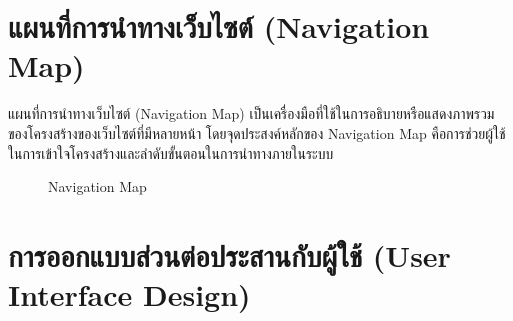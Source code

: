 
\section{แผนที่การนำทางเว็บไซต์ (Navigation Map)}
แผนที่การนำทางเว็บไซต์ (Navigation Map) เป็นเครื่องมือที่ใช้ในการอธิบายหรือแสดงภาพรวมของโครงสร้างของเว็บไซต์ที่มีหลายหน้า โดยจุดประสงค์หลักของ Navigation Map คือการช่วยผู้ใช้ในการเข้าใจโครงสร้างและลำดับขั้นตอนในการนำทางภายในระบบ
\begin{figure}[H]\centering
    \caption{Navigation Map}\label{fig:navMap}
\end{figure}
\newpage

\section{การออกแบบส่วนต่อประสานกับผู้ใช้ (User Interface Design)}
